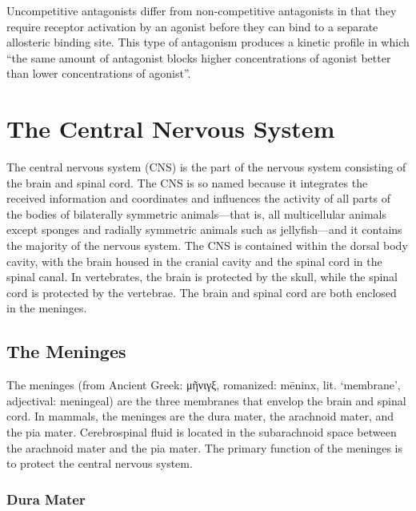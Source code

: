 Uncompetitive antagonists differ from non-competitive antagonists in that they require receptor activation by an agonist before they can bind to a separate allosteric binding site. This type of antagonism produces a kinetic profile in which ``the same amount of antagonist blocks higher concentrations of agonist better than lower concentrations of agonist''.

\hypertarget{the-central-nervous-system}{%
\chapter{The Central Nervous System}\label{the-central-nervous-system}}

The central nervous system (CNS) is the part of the nervous system consisting of the brain and spinal cord. The CNS is so named because it integrates the received information and coordinates and influences the activity of all parts of the bodies of bilaterally symmetric animals---that is, all multicellular animals except sponges and radially symmetric animals such as jellyfish---and it contains the majority of the nervous system. The CNS is contained within the dorsal body cavity, with the brain housed in the cranial cavity and the spinal cord in the spinal canal. In vertebrates, the brain is protected by the skull, while the spinal cord is protected by the vertebrae. The brain and spinal cord are both enclosed in the meninges.

\hypertarget{the-meninges}{%
\section{The Meninges}\label{the-meninges}}

The meninges (from Ancient Greek: μῆνιγξ, romanized: mēninx, lit. `membrane', adjectival: meningeal) are the three membranes that envelop the brain and spinal cord. In mammals, the meninges are the dura mater, the arachnoid mater, and the pia mater. Cerebrospinal fluid is located in the subarachnoid space between the arachnoid mater and the pia mater. The primary function of the meninges is to protect the central nervous system.

\hypertarget{dura-mater}{%
\subsection{Dura Mater}\label{dura-mater}}

